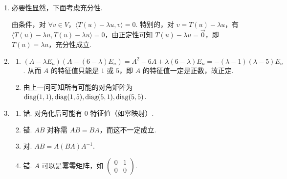 \begin{enumerate}
    \item 必要性显然，下面考虑充分性.

    由条件，对 $\forall v\in V$，$\langle T(u) - \lambda u, v\rangle = 0$. 特别的，对 $v = T(u) - \lambda u$，有 $\langle T(u) - \lambda u, T(u) - \lambda u \rangle = 0$，由正定性可知 $T(u) - \lambda u = \vec{0}$，即 $T(u) = \lambda u$，充分性成立.

    \item
    \begin{enumerate}
        \item $(A-\lambda E_n)(A - (6-\lambda) E_n) = A^2 - 6A + \lambda(6-\lambda) E_n = -(\lambda-1)(\lambda-5)E_n$. 从而 $A$ 的特征值只能是 $1$ 或 $5$，即 $A$ 的特征值一定是正数，故正定.
        \item 由上一问可知所有可能的对角矩阵为 $\operatorname{diag}(1,1), \operatorname{diag}(1,5), \operatorname{diag}(5,1), \operatorname{diag}(5,5)$.
    \end{enumerate}

    \item
    \begin{enumerate}
        \item 错. 对角化后可能有 $0$ 特征值（如零映射）.
        \item 错. $AB$ 对称需 $AB=BA$，而这不一定成立.
        \item 对. $AB = A(BA)A^{-1}$.
        \item 错. $A$ 可以是幂零矩阵，如 $\begin{pmatrix} 0 & 1 \\ 0 & 0 \end{pmatrix}$.
    \end{enumerate}
\end{enumerate}

\clearpage

